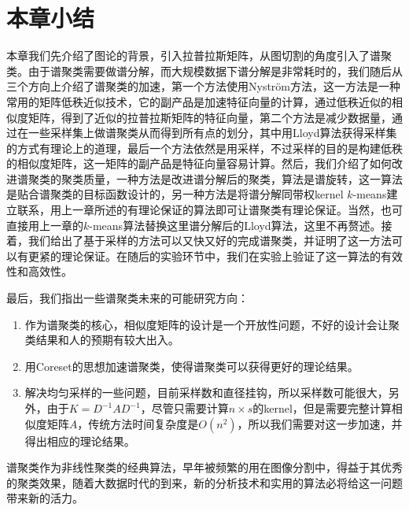 \section{本章小结}
本章我们先介绍了图论的背景，引入拉普拉斯矩阵，从图切割的角度引入了谱聚类。由于谱聚类需要做谱分解，而大规模数据下谱分解是非常耗时的，我们随后从三个方向上介绍了谱聚类的加速，第一个方法使用Nyström方法，这一方法是一种常用的矩阵低秩近似技术，它的副产品是加速特征向量的计算，通过低秩近似的相似度矩阵，得到了近似的拉普拉斯矩阵的特征向量，第二个方法是减少数据量，通过在一些采样集上做谱聚类从而得到所有点的划分，其中用Lloyd算法获得采样集的方式有理论上的道理，最后一个方法依然是用采样，不过采样的目的是构建低秩的相似度矩阵，这一矩阵的副产品是特征向量容易计算。然后，我们介绍了如何改进谱聚类的聚类质量，一种方法是改进谱分解后的聚类，算法是谱旋转，这一算法是贴合谱聚类的目标函数设计的，另一种方法是将谱分解同带权kernel $k$-means建立联系，用上一章所述的有理论保证的算法即可让谱聚类有理论保证。当然，也可直接用上一章的$k$-means算法替换这里谱分解后的Lloyd算法，这里不再赘述。接着，我们给出了基于采样的方法可以又快又好的完成谱聚类，并证明了这一方法可以有更紧的理论保证。在随后的实验环节中，我们在实验上验证了这一算法的有效性和高效性。

最后，我们指出一些谱聚类未来的可能研究方向：
\begin{enumerate}[label=\arabic*)]
	\item 作为谱聚类的核心，相似度矩阵的设计是一个开放性问题，不好的设计会让聚类结果和人的预期有较大出入。
	\item 用Coreset的思想加速谱聚类，使得谱聚类可以获得更好的理论结果。
	\item 解决均匀采样的一些问题，目前采样数和直径挂钩，所以采样数可能很大，另外，由于$K = D^{-1}AD^{-1}$，尽管只需要计算$n \times s$的kernel，但是需要完整计算相似度矩阵$A$，传统方法时间复杂度是$O(n^2)$，所以我们需要对这一步加速，并得出相应的理论结果。
\end{enumerate}
谱聚类作为非线性聚类的经典算法，早年被频繁的用在图像分割中，得益于其优秀的聚类效果，随着大数据时代的到来，新的分析技术和实用的算法必将给这一问题带来新的活力。
